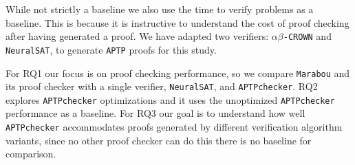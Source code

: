 \documentclass[oneside,11pt,dvipsnames]{book}
\newcommand{\nnproofchecker}{\texttt{APTPchecker}}
\newcommand{\nnproofformat}{\texttt{APTP}}
\newcommand{\crown}{\texttt{$\alpha\beta$-CROWN}}
\newcommand{\marabou}{\texttt{Marabou}}
\newcommand{\neuralsat}{\texttt{NeuralSAT}}
\begin{document}
While not strictly a baseline we also use the time to verify problems
as a baseline.  This is because it is instructive to understand 
the cost of proof checking after having generated a proof.
We have adapted two verifiers: \crown{} and \neuralsat{}, to 
generate \nnproofformat{} proofs for this study.

For RQ1 our focus is on proof checking performance, so we compare
\marabou{} and its proof checker with a single verifier, \neuralsat{},
and \nnproofchecker{}.  
RQ2 explores \nnproofchecker{} optimizations and it uses the unoptimized
\nnproofchecker{} performance as a baseline.
For RQ3 our goal is to understand how well \nnproofchecker{} accommodates
proofs generated by different verification algorithm variants, since no
other proof checker can do this there is no baseline for comparison.
\end{document}
